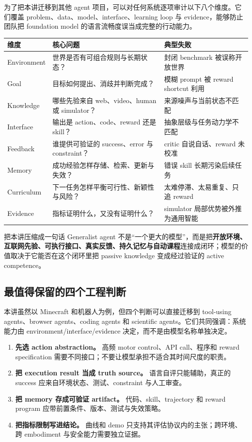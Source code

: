\documentclass[a4paper]{article}
\begin{document}
为了把本讲迁移到其他 agent 项目，可以对任何系统逐项审计以下八个维度。它们覆盖 problem、data、model、interface、learning loop 与 evidence，能够防止团队把 foundation model 的语言流畅度误当成完整的行动能力。

\begin{longtable}{@{}L{0.18\textwidth}L{0.34\textwidth}L{0.36\textwidth}@{}}
\toprule
维度 & 核心问题 & 典型失败 \\
\midrule
Environment & 世界是否有可组合规则与长期状态？ & 封闭 benchmark 被误称开放世界 \\
Goal & 目标如何提出、消歧并判断完成？ & 模糊 prompt 被 reward shortcut 利用 \\
Knowledge & 哪些先验来自 web、video、human 或 simulator？ & 来源噪声与当前状态不匹配 \\
Interface & 输出是 action、code、reward 还是 skill？ & 抽象层级与任务动力学不匹配 \\
Feedback & 谁提供可验证的 success、error 与 constraint？ & critic 自说自话、reward 未校准 \\
Memory & 成功经验怎样存储、检索、更新与失效？ & 错误 skill 长期污染后续任务 \\
Curriculum & 下一任务怎样平衡可行性、新颖性与风险？ & 太难停滞、太易重复、只追 reward \\
Evidence & 指标证明什么，又没有证明什么？ & simulator 局部优势被外推为通用智能 \\
\bottomrule
\end{longtable}

\begin{importantbox}{把本讲压缩成一句话}
Generalist agent 不是“一个更大的模型”，而是把\textbf{开放环境、互联网先验、可执行接口、真实反馈、持久记忆与自动课程}连接成闭环；模型的价值取决于它能否在这个闭环里把 passive knowledge 变成经过验证的 active competence。
\end{importantbox}

\subsection{最值得保留的四个工程判断}

本讲虽然以 Minecraft 和机器人为例，但四个判断可以直接迁移到 tool-using agents、browser agents、coding agents 和 scientific agents。它们共同强调：系统能力由 environment/interface/evidence 决定，而不是由模型名称单独决定。

\begin{enumerate}
  \item \textbf{先选 action abstraction。} 高频 motor control、API call、程序和 reward specification 需要不同接口；不要让模型承担不适合其时间尺度的职责。
  \item \textbf{把 execution result 当成 truth source。} 语言自评只能辅助，真正的 success 应来自环境状态、测试、constraint 与人工审查。
  \item \textbf{把 memory 存成可验证 artifact。} 代码、skill、trajectory 和 reward program 应带前置条件、版本、测试与失效策略。
  \item \textbf{把指标限制写进结论。} 曲线和 demo 只支持其评估协议内的主张；跨环境、跨 embodiment 与安全能力需要独立证据。
\end{enumerate}
\end{document}
